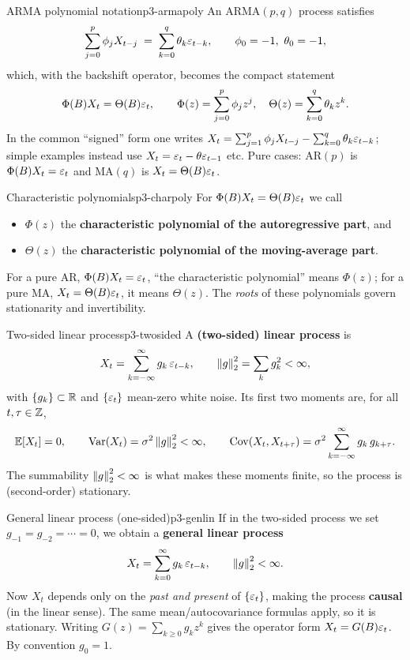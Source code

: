 \begin{definition}{ARMA polynomial notation}{p3-armapoly}
An $\mathrm{ARMA}(p,q)$ process satisfies
\[
\sum_{j=0}^{p}\phi_j X_{t-j} \;=\; \sum_{k=0}^{q}\theta_k\varepsilon_{t-k},
\qquad \phi_0=-1,\ \theta_0=-1,
\]
which, with the backshift operator, becomes the compact statement
\[
\Phi(B)X_t=\Theta(B)\varepsilon_t,\qquad
\Phi(z)=\sum_{j=0}^{p}\phi_j z^{j},\quad
\Theta(z)=\sum_{k=0}^{q}\theta_k z^{k}.
\]
In the common ``signed'' form one writes
$X_t=\sum_{j=1}^{p}\phi_j X_{t-j}-\sum_{k=0}^{q}\theta_k\varepsilon_{t-k}$;
simple examples instead use $X_t=\varepsilon_t-\theta\varepsilon_{t-1}$ etc. Pure cases:
$\mathrm{AR}(p)$ is $\Phi(B)X_t=\varepsilon_t$ and $\mathrm{MA}(q)$ is
$X_t=\Theta(B)\varepsilon_t$.
\end{definition}

\begin{definition}{Characteristic polynomials}{p3-charpoly}
For $\Phi(B)X_t=\Theta(B)\varepsilon_t$ we call
\begin{itemize}
  \item $\Phi(z)$ the \textbf{characteristic polynomial of the autoregressive
        part}, and
  \item $\Theta(z)$ the \textbf{characteristic polynomial of the moving-average
        part}.
\end{itemize}
For a pure $\mathrm{AR}$, $\Phi(B)X_t=\varepsilon_t$, ``the characteristic
polynomial'' means $\Phi(z)$; for a pure $\mathrm{MA}$,
$X_t=\Theta(B)\varepsilon_t$, it means $\Theta(z)$. The \emph{roots} of these
polynomials govern stationarity and invertibility.
\end{definition}

\begin{definition}{Two-sided linear process}{p3-twosided}
A \textbf{(two-sided) linear process} is
\[
X_t=\sum_{k=-\infty}^{\infty}g_k\,\varepsilon_{t-k},
\qquad \left\lVert g \right\rVert_2^2=\sum_k g_k^2<\infty,
\]
with $\{g_k\}\subset\mathbb{R}$ and $\{\varepsilon_t\}$ mean-zero white noise. Its first
two moments are, for all $t,\tau\in\mathbb{Z}$,
\[
\mathbb{E}[X_t]=0,\qquad
\operatorname{Var}(X_t)=\sigma^2\left\lVert g \right\rVert_2^2<\infty,\qquad
\operatorname{Cov}(X_t,X_{t+\tau})=\sigma^2\sum_{k=-\infty}^{\infty}g_k\,g_{k+\tau}.
\]
The summability $\left\lVert g \right\rVert_2^2<\infty$ is what makes these moments finite, so the
process is (second-order) stationary.
\end{definition}

\begin{definition}{General linear process (one-sided)}{p3-genlin}
If in the two-sided process we set $g_{-1}=g_{-2}=\cdots=0$, we obtain a
\textbf{general linear process}
\[
X_t=\sum_{k=0}^{\infty}g_k\,\varepsilon_{t-k},\qquad \left\lVert g \right\rVert_2^2<\infty .
\]
Now $X_t$ depends only on the \emph{past and present} of $\{\varepsilon_t\}$, making
the process \textbf{causal} (in the linear sense). The same mean/autocovariance
formulas apply, so it is stationary. Writing $G(z)=\sum_{k\ge0}g_kz^k$ gives the
operator form $X_t=G(B)\varepsilon_t$. By convention $g_0=1$.
\end{definition}

